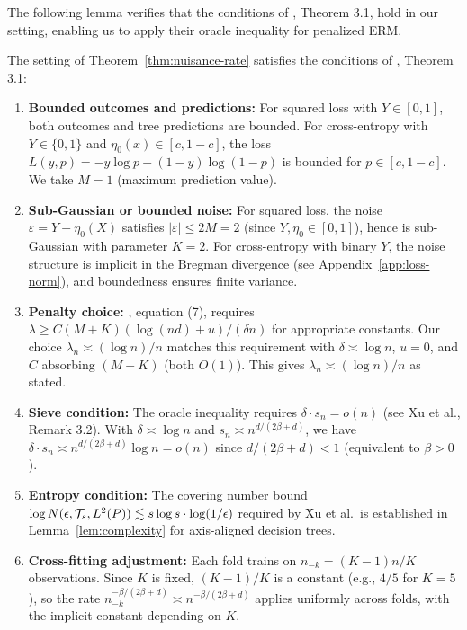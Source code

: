 \documentclass[12pt]{article}
\begin{document}
The following lemma verifies that the conditions of \citet{xuStatisticalOptimalityOptimal2026}, Theorem 3.1, hold in our setting, enabling us to apply their oracle inequality for penalized ERM.

\begin{lemma}
\label{lem:xu-verification}
The setting of Theorem~\ref{thm:nuisance-rate} satisfies the conditions of \citet{xuStatisticalOptimalityOptimal2026}, Theorem 3.1:

\begin{enumerate}
\item \textbf{Bounded outcomes and predictions:} For squared loss with $Y \in [0,1]$, both outcomes and tree predictions are bounded. For cross-entropy with $Y \in \{0,1\}$ and $\eta_0(x) \in [c, 1-c]$, the loss $L(y,p) = -y \log p - (1-y) \log(1-p)$ is bounded for $p \in [c,1-c]$. We take $M = 1$ (maximum prediction value).

\item \textbf{Sub-Gaussian or bounded noise:} For squared loss, the noise $\varepsilon = Y - \eta_0(X)$ satisfies $|\varepsilon| \le 2M = 2$ (since $Y, \eta_0 \in [0,1]$), hence is sub-Gaussian with parameter $K = 2$. For cross-entropy with binary $Y$, the noise structure is implicit in the Bregman divergence (see Appendix~\ref{app:loss-norm}), and boundedness ensures finite variance.

\item \textbf{Penalty choice:} \citet{xuStatisticalOptimalityOptimal2026}, equation (7), requires $\lambda \ge C(M+K)(\log(nd)+u)/(\delta n)$ for appropriate constants. Our choice $\lambda_n \asymp (\log n)/n$ matches this requirement with $\delta \asymp \log n$, $u = 0$, and $C$ absorbing $(M+K)$ (both $O(1)$). This gives $\lambda_n \asymp (\log n)/n$ as stated.

\item \textbf{Sieve condition:} The oracle inequality requires $\delta \cdot s_n = o(n)$ (see Xu et al., Remark 3.2). With $\delta \asymp \log n$ and $s_n \asymp n^{d/(2\beta+d)}$, we have $\delta \cdot s_n \asymp n^{d/(2\beta+d)} \log n = o(n)$ since $d/(2\beta+d) < 1$ (equivalent to $\beta > 0$).

\item \textbf{Entropy condition:} The covering number bound $\log N(\epsilon, \mathcal{T}_s, L^2(P)) \lesssim s \log s \cdot \log(1/\epsilon)$ required by Xu et al.\ is established in Lemma~\ref{lem:complexity} for axis-aligned decision trees.

\item \textbf{Cross-fitting adjustment:} Each fold trains on $n_{-k} = (K-1)n/K$ observations. Since $K$ is fixed, $(K-1)/K$ is a constant (e.g., $4/5$ for $K=5$), so the rate $n_{-k}^{-\beta/(2\beta+d)} \asymp n^{-\beta/(2\beta+d)}$ applies uniformly across folds, with the implicit constant depending on $K$.
\end{enumerate}
\end{lemma}
\end{document}
